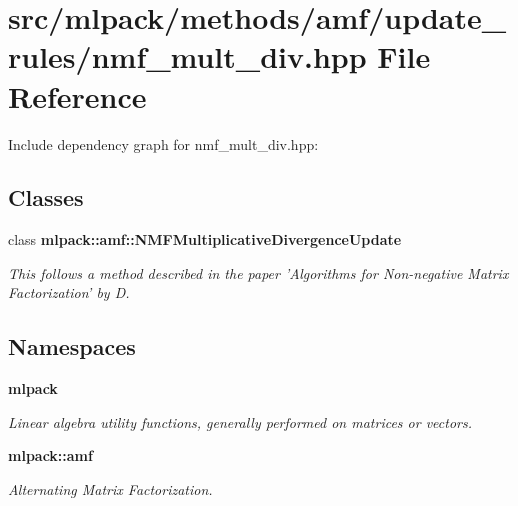 \section{src/mlpack/methods/amf/update\-\_\-rules/nmf\-\_\-mult\-\_\-div.hpp File Reference}
\label{nmf__mult__div_8hpp}
Include dependency graph for nmf\-\_\-mult\-\_\-div.\-hpp\-:
\subsection*{Classes}
\begin{DoxyCompactItemize}
\item 
class {\bf mlpack\-::amf\-::\-N\-M\-F\-Multiplicative\-Divergence\-Update}
\begin{DoxyCompactList}\small\item\em This follows a method described in the paper 'Algorithms for Non-\/negative Matrix Factorization' by D. \end{DoxyCompactList}\end{DoxyCompactItemize}
\subsection*{Namespaces}
\begin{DoxyCompactItemize}
\item 
{\bf mlpack}
\begin{DoxyCompactList}\small\item\em Linear algebra utility functions, generally performed on matrices or vectors. \end{DoxyCompactList}\item 
{\bf mlpack\-::amf}
\begin{DoxyCompactList}\small\item\em Alternating Matrix Factorization. \end{DoxyCompactList}\end{DoxyCompactItemize}
